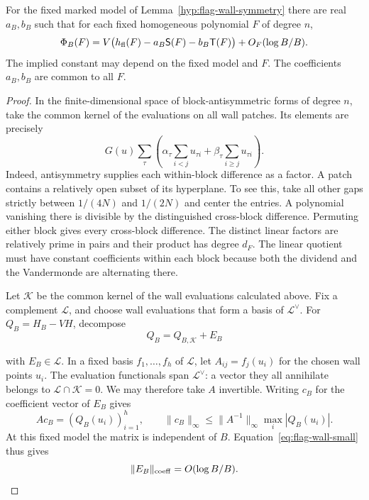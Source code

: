 \begin{proposition}\label{prop:flag-two-moving-shifts}
For the fixed marked model of Lemma~\ref{hyp:flag-wall-symmetry}
there are real \(a_B,b_B\) such that
for each fixed homogeneous polynomial \(F\) of degree \(n\),
\begin{equation}\label{eq:flag-moving-shifts}
 \Phi_B(F)=V\bigl(h_{\rm fl}(F)
                  -a_B\mathsf S(F)-b_B\mathsf T(F)\bigr)
                     +O_F(\log B/B).
\end{equation}
The implied constant may depend on the fixed model and \(F\).
The coefficients \(a_B,b_B\) are common to all \(F\).
\end{proposition}

\begin{proof}
In the finite-dimensional space of block-antisymmetric forms
of degree \(n\), take the common kernel of the evaluations on
all wall patches. Its elements are precisely
\[
  G(u)\sum_\tau\left(\alpha_\tau\sum_{i<j}u_{\tau i}
                    +\beta_\tau\sum_{i\ge j}u_{\tau i}\right).
\]
Indeed, antisymmetry supplies each within-block difference as
a factor. A patch contains a relatively open subset of its
hyperplane. To see this, take all other gaps strictly between \(1/(4N)\)
and \(1/(2N)\) and center the entries. A polynomial vanishing
there is divisible by the distinguished cross-block difference.
Permuting either block gives every cross-block difference.
The distinct linear factors are relatively prime in pairs
and their product has degree \(d_F\). The linear quotient
must have constant coefficients within each block because
both the dividend and the Vandermonde are alternating there.

Let \(\mathcal K\) be the common kernel of the wall evaluations
calculated above. Fix a complement \(\mathcal L\), and choose
wall evaluations that form a basis of \(\mathcal L^\vee\).
For \(Q_B=H_B-VH\), decompose
\[
 Q_B=Q_{B,\mathcal K}+E_B
\]

with \(E_B\in\mathcal L\). In a fixed basis \(f_1,\ldots,f_h\) of \(\mathcal L\), let \(A_{ij}=f_j(u_i)\) for the chosen wall points \(u_i\). The evaluation functionals span \(\mathcal L^\vee\): a vector they all annihilate belongs to \(\mathcal L\cap\mathcal K=0\). We may therefore take \(A\) invertible. Writing \(c_B\) for the coefficient vector of \(E_B\) gives
\[
 A c_B=(Q_B(u_i))_{i=1}^h,\qquad
 \|c_B\|_\infty\le\|A^{-1}\|_\infty\max_i|Q_B(u_i)|.
\]
At this fixed model the matrix is independent of \(B\). Equation~\eqref{eq:flag-wall-small} thus gives
\[
 \|E_B\|_{\rm coeff}=O(\log B/B).
\]


\end{proof}
